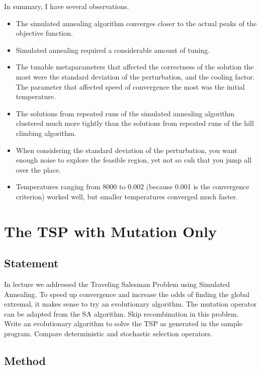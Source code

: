 \documentclass{article}
\begin{document}
In summary, I have several observations.
\begin{itemize}
    \item The simulated annealing algorithm converges closer to the actual peaks of the objective
          function.
    \item Simulated annealing required a considerable amount of tuning.
    \item The tunable metaparameters that affected the correctness of the solution the most were
          the standard deviation of the perturbation, and the cooling factor. The parameter that
          affected speed of convergence the most was the initial temperature.
    \item The solutions from repeated runs of the simulated annealing algorithm clustered much more
          tightly than the solutions from repeated runs of the hill climbing algorithm.
    \item When considering the standard deviation of the perturbation, you want enough noise to
          explore the feasible region, yet not so cuh that you jump all over the place.
    \item Temperatures ranging from $8000$ to $0.002$ (because 0.001 is the convergence criterion)
          worked well, but smaller temperatures converged much faster.
\end{itemize}

\section{The TSP with Mutation Only}\label{prob:2}
\subsection{Statement}
In lecture we addressed the Traveling Salesman Problem using Simulated Annealing. To speed up
convergence and increase the odds of finding the global extremal, it makes sense to try an
evolutionary algorithm. The mutation operator can be adapted from the SA algorithm. Skip
recombination in this problem. Write an evolutionary algorithm to solve the TSP as generated in the
sample program. Compare deterministic and stochastic selection operators.

\subsection{Method}
\end{document}
